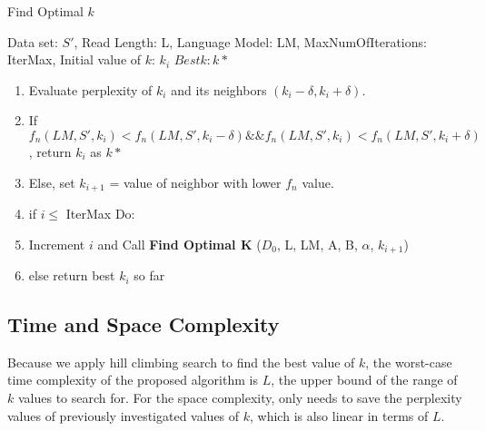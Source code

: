 \begin{minipage}[t]{.45\textwidth}
\begin{algorithm} [H]
\caption{Find Optimal $k$}
\begin{algorithmic} 
\REQUIRE Data set: $S'$, Read Length: L, Language Model: LM, MaxNumOfIterations: IterMax, Initial value of $k$: $k_i$ 
\ENSURE $Best k: k*$
\begin{flushleft}
\begin{enumerate}
\itemsep0em
\item %
Evaluate perplexity of $k_i$ and its neighbors $(k_i-\delta, k_i+\delta)$.
\item If $f_n(LM,S',k_i) < f_n(LM,S',k_i-\delta) \&\& f_n(LM,S',k_i) < f_n(LM,S',k_i+\delta)$, return $k_i$ as $k*$
\item Else, set $k_{i+1}$ = value of neighbor with lower $f_n$ value.
\item if $i \leq$ IterMax Do:
\item \quad Increment $i$ and Call \textbf{Find Optimal K} ($D_{0}$, L, LM, A, B, $\alpha$, $k_{i+1}$)
\item else  \quad return best $k_i$ so far
\end{enumerate}%
\end{flushleft}
\end{algorithmic}
\end{algorithm}

\end{minipage}

\subsection{Time and Space Complexity}
Because we apply hill climbing search to find the best value of $k$, the worst-case time complexity of the proposed algorithm is $L$, the upper bound of the range of $k$ values to search for. For the space complexity, \name only needs to save the perplexity values of previously investigated values of $k$, which is also linear in terms of $L$.


